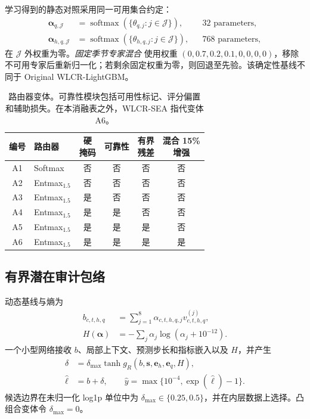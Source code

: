 \documentclass[10pt,conference,letterpaper]{IEEEtran}
\renewcommand{\arraystretch}{1.06}
\newcommand{\method}{WLCR-SEA}
\newcommand{\originalmethod}{Original WLCR-LightGBM}
\newcommand{\fixedmixture}{固定季节专家混合}
\begin{document}
学习得到的静态对照采用同一可用集合约定：
\begin{align}
\boldsymbol\alpha_{q,\mathcal J}&=\operatorname{softmax}(\{\theta_{q,j}:j\in\mathcal J\}), &&32\text{ parameters},\\
\boldsymbol\alpha_{h,q,\mathcal J}&=\operatorname{softmax}(\{\theta_{h,q,j}:j\in\mathcal J\}), &&768\text{ parameters},
\end{align}
在 $\mathcal J$ 外权重为零。\emph{\fixedmixture{}} 使用权重 $(0,0.7,0.2,0.1,0,0,0,0)$，移除不可用专家后重新归一化；若剩余固定权重为零，则回退至先验。该确定性基线不同于 \originalmethod{}。

\begin{table}[t]
\centering
\caption{路由器变体。可靠性模块包括可用性标记、评分偏置和辅助损失。在本消融表之外，\method{} 指代变体 A6。}
\label{tab:variants}
\footnotesize
\setlength{\tabcolsep}{2.0pt}
\renewcommand{\arraystretch}{1.05}
\begin{tabular*}{\columnwidth}{@{\extracolsep{\fill}}clcccc@{}}
\toprule
编号 & 路由器 & \shortstack{硬\\掩码} & 可靠性 & \shortstack{有界\\残差} & \shortstack{混合 15\%\\增强}\\
\midrule
A1 & Softmax & 否 & 否 & 否 & 否\\
A2 & Entmax$_{1.5}$ & 否 & 否 & 否 & 否\\
A3 & Entmax$_{1.5}$ & 是 & 否 & 否 & 否\\
A4 & Entmax$_{1.5}$ & 是 & 是 & 否 & 否\\
A5 & Entmax$_{1.5}$ & 是 & 是 & 是 & 否\\
A6 & Entmax$_{1.5}$ & 是 & 是 & 是 & 是\\
\bottomrule
\end{tabular*}
\end{table}

\subsection{有界潜在审计包络}
动态基线与熵为
\begin{align}
b_{c,t,h,q}&=\sum_{j=1}^{8}\alpha_{c,t,h,q,j}v^{(j)}_{c,t,h,q},\\
H(\boldsymbol\alpha)&=-\sum_j\alpha_j\log(\alpha_j+10^{-12}).
\end{align}
一个小型网络接收 $b$、局部上下文、预测步长和指标嵌入以及 $H$，并产生
\begin{align}
\delta&=\delta_{\max}\tanh g_R(b,\mathbf s,\mathbf e_h,\mathbf e_q,H),\\
\widehat\ell&=b+\delta,\qquad
\widehat y=\max\{10^{-4},\exp(\widehat\ell)-1\}.
\end{align}
候选边界在未归一化 log1p 单位中为 $\delta_{\max}\in\{0.25,0.5\}$，并在内层数据上选择。凸组合变体令 $\delta_{\max}=0$。
\end{document}
